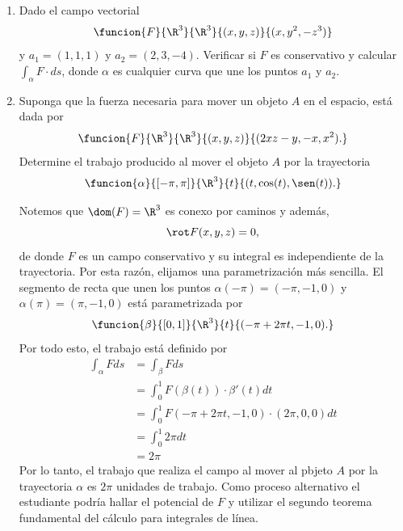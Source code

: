 \documentclass[a4,11pt]{aleph-examen}
\begin{document}
\begin{preguntas}
\begin{respuesta}
\begin{respuesta}
\begin{respuesta}
\begin{enumerate}
\item Dado el campo vectorial
    \[
    \funcion{F}{\R^3}{\R^3}
    {(x,y,z)}{(x,y^2,-z^3)}
	\]
    y $a_1=(1,1,1)$ y $a_2=(2,3,-4)$.
    Verificar si $F$ es conservativo y calcular $\int_{\alpha}{F\cdot ds}$, donde $\alpha$ es cualquier curva que une los puntos $a_1$ y $a_2$.
\item Suponga que la fuerza necesaria para mover un objeto $A$ en el espacio, está dada por
\[
    \funcion{F}{\R^3}{\R^3}{(x,y,z)}{(2xz-y,-x,x^2).}
\]
Determine el trabajo producido al mover el objeto $A$ por la trayectoria
\[
    \funcion{\alpha}{[-\pi,\pi]}{\R^3}{t}{(t,\cos(t),\sen(t)).}
\]

\begin{respuesta}
    Notemos que $\dom(F)=\R^3$ es conexo por caminos y además,
    \[
        \rot F(x,y,z)=0,
    \]
    de donde $F$ es un campo conservativo y su integral es independiente de la trayectoria. Por esta razón, elijamos una parametrización más sencilla. El segmento de recta que unen los puntos $\alpha(-\pi)=(-\pi,-1,0)$ y $\alpha(\pi)=(\pi,-1,0)$ está parametrizada por
    \[
        \funcion{\beta}{[0,1]}{\R^3}{t}{(-\pi +2\pi t,-1,0).}
    \]
    Por todo esto, el trabajo está definido por
    \begin{align*}
        \int_\alpha F ds
        &=\int_\beta F ds\\
        &=\int_0^1 F(\beta(t)) \cdot \beta'(t) dt\\
        &=\int_0^1 F(-\pi +2\pi t,-1,0) \cdot (2\pi,0,0) dt\\
        &=\int_0^1 2\pi dt\\
        &=2\pi        
    \end{align*}
    Por lo tanto, el trabajo que realiza el campo al mover al pbjeto $A$ por la trayectoria $\alpha$ es $2\pi$ unidades de trabajo. Como proceso alternativo el estudiante podría hallar el potencial de $F$ y utilizar el segundo teorema fundamental del cálculo para integrales de línea.
\end{respuesta}


\end{enumerate}
\end{respuesta}
\end{respuesta}
\end{respuesta}
\end{preguntas}
\end{document}
